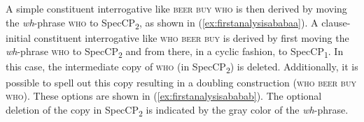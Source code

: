 A simple constituent interrogative like \textsc{beer buy who} is then derived by moving the \textit{wh}-phrase \textsc{who} to SpecCP\textsubscript{2}, as shown in (\ref{ex:firstanalysisababaa}). A clause-initial constituent interrogative like \textsc{who beer buy} is derived by first moving the \textit{wh}-phrase \textsc{who} to SpecCP\textsubscript{2} and from there, in a cyclic fashion, to SpecCP\textsubscript{1}. In this case, the intermediate copy of \textsc{who} (in SpecCP\textsubscript{2}) is deleted. Additionally, it is possible to spell out this copy resulting in a doubling construction (\textsc{who beer buy who}). These options are shown in (\ref{ex:firstanalysisababab}). The optional deletion of the copy in SpecCP\textsubscript{2} is indicated by the gray color of the \textit{wh}-phrase.
\clearpage
\begin{exe}
\ex\label{ex:firstanalysisababa}
\begin{multicols}{2}
\begin{xlist}
\ex \label{ex:firstanalysisababaa}
\begin{adjustbox}{max width=0.38\textwidth}
\end{adjustbox}
\ex\label{ex:firstanalysisababab}
\begin{adjustbox}{max width=0.38\textwidth}
\end{adjustbox}
\end{xlist}
\end{multicols}
\end{exe}
